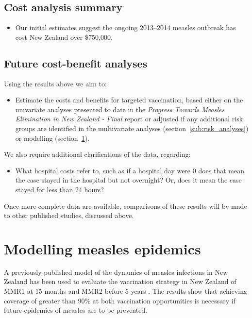 \documentclass{article}
\begin{document}
{\subsection{Cost analysis summary}
\begin{itemize}
\item Our initial estimates suggest the ongoing 2013--2014 measles outbreak has cost New Zealand over \$750,000.
\end{itemize}

\subsection{Future cost-benefit analyses}
Using the results above we aim to:
\begin{itemize}
\item Estimate the costs and benefits for targeted vaccination, based either on the univariate analyses presented to date in the \emph {Progress Towards Measles Elimination in New Zealand - Final} report or adjusted if any additional risk groups are identified in the multivariate analyses (section~\ref{sub:risk_analyses}) or modelling (section~\ref{sec:epidemic_modelling}).
\end{itemize}

We also require additional clarifications of the data, regarding:
\begin {itemize}
\item What hospital costs refer to, such as if a hospital day were 0 does that mean the case stayed in the hospital but not overnight? Or, does it mean the case stayed for less than 24 hours?
\end {itemize}
Once more complete data are available, comparisons of these results will be made to other published studies, discussed above.

\section{Modelling measles epidemics}
\label{sec:epidemic_modelling}

A previously-published model of the dynamics of measles infections in New Zealand has been used to evaluate the vaccination strategy in New Zealand of MMR1 at 15 months and MMR2 before 5 years \citep{roberts0,roberts4,tobias98}. The results show that achieving coverage of greater than 90\% at both vaccination opportunities is necessary if future epidemics of measles are to be prevented.

}
\end{document}

